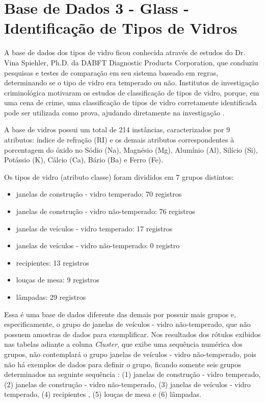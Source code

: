 \section{Base de Dados 3 - Glass - Identificação de Tipos de Vidros}\label{cap:resultados:ssec:iris}


A base de dados dos tipos de vidro ficou conhecida através de estudos do Dr. Vina Spiehler, Ph.D. da DABFT Diagnostic Products Corporation,  que conduziu pesquisas e testes de comparação em seu sistema baseado em regras, determinando se o tipo de vidro era temperado ou não. Institutos de investigação criminológica motivaram os estudos de classificação de tipos de vidro, porque, em uma cena de crime, uma classificação de tipos de vidro corretamente identificada pode ser utilizada como prova, ajudando diretamente na investigação \cite{Evett:1989}.

A base de vidros possui um total de 214 instâncias, caracterizados por 9 atributos: índice de refração (RI) e os demais atributos correspondentes à porcentagem do óxido no Sódio (Na), Magnésio (Mg), Alumínio (Al), Silício (Si), Potássio (K), Cálcio (Ca), Bário (Ba) e Ferro (Fe).

Os tipos de vidro (atributo classe) foram divididos em 7 grupos distintos:
\begin{itemize} [noitemsep]
 \item janelas de construção - vidro temperado: 70 registros
 \item janelas de construção - vidro não-temperado: 76 registros
 \item janelas de veículos - vidro temperado: 17 registros
 \item janelas de veículos - vidro não-temperado: 0 registro
 \item recipientes: 13 registros
 \item louças de mesa: 9 registros
 \item lâmpadas: 29 registros 
\end{itemize}


Essa é uma base de dados diferente das demais por possuir mais grupos e, especificamente, o grupo de janelas de veículos - vidro não-temperado, que não possuem amostras de dados para exemplificar. Nos resultados dos rótulos exibidos nas tabelas adiante a coluna \textit{Cluster}, que exibe uma sequência numérica dos grupos, não contemplará o grupo janelas de veículos - vidro não-temperado, pois não há exemplos de dados para definir o grupo, ficando somente seis grupos determinados na seguinte sequência : (1) janelas de construção - vidro temperado, (2) janelas de construção - vidro não-temperado, (3) janelas de veículos - vidro temperado, (4) recipientes , (5) louças de mesa e (6) lâmpadas. 


